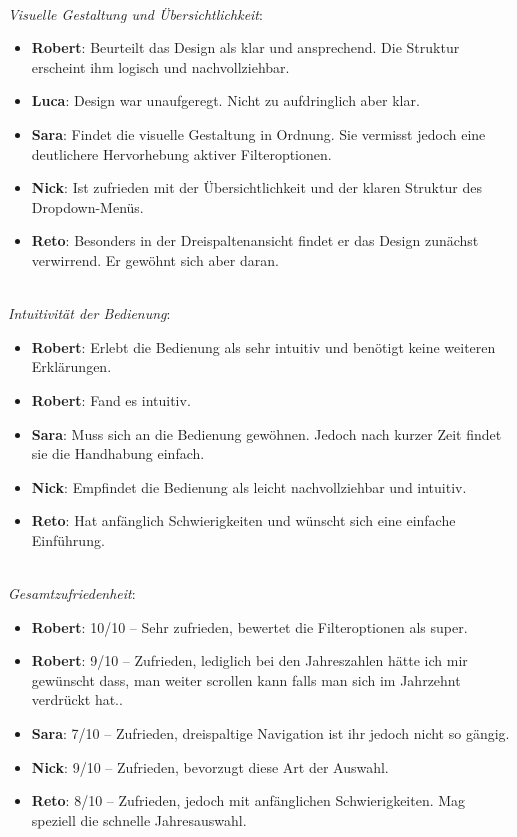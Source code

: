  \\
\emph{Visuelle Gestaltung und Übersichtlichkeit}: 

\begin{itemize}
    \item \textbf{Robert}: 
          Beurteilt das Design als klar und ansprechend. 
          Die Struktur erscheint ihm logisch und nachvollziehbar.
\item \textbf{Luca}:
Design war unaufgeregt. Nicht zu aufdringlich aber klar.
\item \textbf{Sara}:
          Findet die visuelle Gestaltung in Ordnung. 
          Sie vermisst jedoch eine deutlichere Hervorhebung aktiver Filteroptionen. 
    \item \textbf{Nick}: 
          Ist zufrieden mit der Übersichtlichkeit und der klaren Struktur des Drop\-down-Menüs. 
    \item \textbf{Reto}: 
          Besonders in der Dreispaltenansicht findet er das Design zunächst verwirrend. 
          Er gewöhnt sich aber daran. 
\end{itemize}

 \\
\emph{Intuitivität der Bedienung}: 

\begin{itemize}
    \item \textbf{Robert}: 
          Erlebt die Bedienung als sehr intuitiv und benötigt keine weiteren Erklärungen.
\item \textbf{Robert}:
Fand es intuitiv.
    \item \textbf{Sara}: 
          Muss sich an die Bedienung gewöhnen. 
          Jedoch nach kurzer Zeit findet sie die Handhabung einfach. 
    \item \textbf{Nick}: 
          Empfindet die Bedienung als leicht nachvollziehbar und intuitiv. 
    \item \textbf{Reto}: 
          Hat anfänglich Schwierigkeiten und wünscht sich eine einfache Einführung. 
\end{itemize}

 \\
\emph{Gesamtzufriedenheit}: 

\begin{itemize}
    \item \textbf{Robert}: 
          {\color{editorGreen} 10/10} – Sehr zufrieden, bewertet die Filteroptionen als super.
\item \textbf{Robert}:
{\color{editorGreen} 9/10} – Zufrieden, lediglich bei den Jahreszahlen hätte ich mir gewünscht dass, man weiter scrollen kann falls man sich im Jahrzehnt verdrückt hat..
    \item \textbf{Sara}: 
          {\color{editorGreen} 7/10} – Zufrieden, dreispaltige Navigation ist ihr jedoch nicht so gängig. 
    \item \textbf{Nick}: 
          {\color{editorGreen} 9/10} – Zufrieden, bevorzugt diese Art der Auswahl. 
    \item \textbf{Reto}: 
          {\color{editorGreen} 8/10} – Zufrieden, jedoch mit anfänglichen Schwierigkeiten. 
          Mag speziell die schnelle Jahresauswahl. 
\end{itemize}

